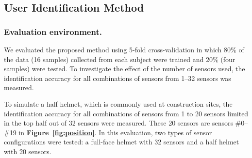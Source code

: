 \documentclass[sigchi,authordraft]{acmart}
\newcommand\figref[1]{\textbf{Figure~\ref{fig:#1}}}
\begin{document}


\subsection{User Identification Method}
\subsubsection{Evaluation environment.}
We evaluated the proposed method using 5-fold cross-validation in which 80\% of the data (16 samples) collected from each subject were trained and 20\% (four samples) were tested. To investigate the effect of the number of sensors used, the identification accuracy for all combinations of sensors from 1–32 sensors was measured.\par

To simulate a half helmet, which is commonly used at construction sites, the identification accuracy for all combinations of sensors from 1 to 20 sensors limited in the top half out of 32 sensors were measured. These 20 sensors are sensors \#0--\#19 in \figref{position}. In this evaluation, two types of sensor configurations were tested: a full-face helmet with 32 sensors and a half helmet with 20 sensors.
\end{document}
